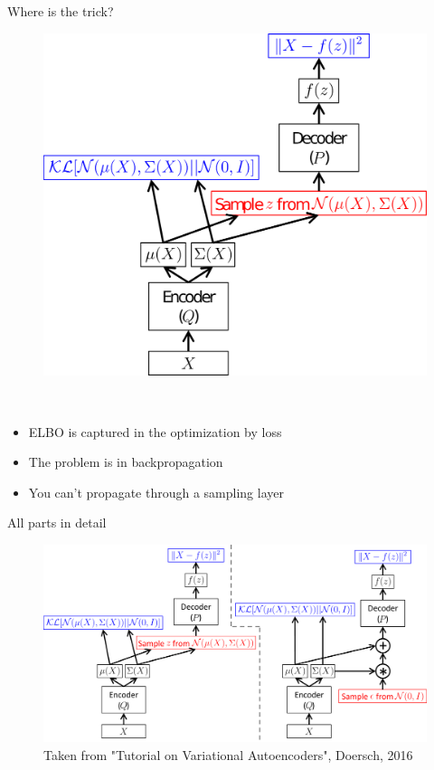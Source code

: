 \documentclass[10pt,aspectratio=169]{beamer}
\begin{document}
\begin{frame}{Where is the trick?}
    \begin{minipage}[c]{0.3\textwidth}
            \begin{figure}
                \includegraphics[width=.9\textwidth]{figs/net.png}
            \end{figure}
    \end{minipage}
    ~
    \begin{minipage}[c]{0.6\textwidth}
        \begin{itemize}[<+(1)->]
            \item ELBO is captured in the optimization by loss
            \item The problem is in backpropagation
            \item You can't propagate through a sampling layer
        \end{itemize}
    \end{minipage}
    
\end{frame}

\begin{frame}{All parts in detail}
	\begin{center}
            \begin{figure}
                \includegraphics[width=.9\textwidth]{figs/net.pdf}
                \caption{Taken from "Tutorial on Variational Autoencoders", Doersch, 2016}
            \end{figure}
	\end{center}
\end{frame}
\end{document}
